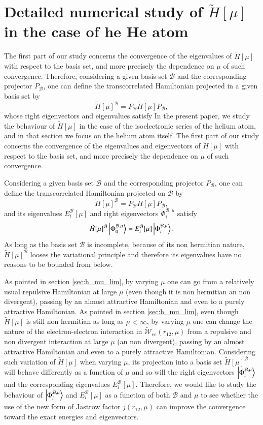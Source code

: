 \documentclass[aip,jcp,reprint,noshowkeys,superscriptaddress]{revtex4-1}
\newcommand{\phimub}[0]{\Phi^{\mathcal{B},\mu}_0}
\newcommand{\phiimub}[0]{\Phi^{\mathcal{B},\mu}_i}
\newcommand{\basis}[0]{\mathcal{B}}
\begin{document}
\section{Detailed numerical study of $\tilde{H}[\mu]$ in the case of he He atom}
The first part of our study concerns the convergence of the eigenvalues of $\tilde{H}[\mu]$ with respect to the basis set, and more precisely the dependence on $\mu$ of such convergence. 
Therefore, considering a given basis set $\basis$ and the corresponding projector $P_\basis$, one can define the transcorrelated Hamiltonian projected in a given basis set by
\begin{equation}
 \tilde{H}[\mu]^{\basis} = P_\basis \tilde{H}[\mu] P_\basis,
\end{equation}
whose right eigenvectors and eigenvalues satisfy 
In the present paper, we study the behaviour of $\tilde{H}[\mu]$ in the case of the isoelectronic series of the helium atom, and in that section we focus on the helium atom itself. 
The first part of our study concerns the convergence of the eigenvalues and eigenvectors of $\tilde{H}[\mu]$ with respect to the basis set, and more precisely the dependence on $\mu$ of such convergence. 

Considering a given basis set $\basis$ and the corresponding projector $P_\basis$, one can define the transcorrelated Hamiltonian projected on $\basis$ by
\begin{equation}
 \tilde{H}[\mu]^{\basis} = P_\basis \tilde{H}[\mu] P_\basis,
\end{equation}
and its eigenvalues $E_i^{\basis}[\mu]$ and right eigenvectors $\phiimub$ satisfy 
\begin{equation}
 \tilde{H}[\mu]^{\basis} \ket{\phimub} = E_i^{\basis}[\mu] \ket{\phiimub}. 
\end{equation}
As long as the basis set $\basis$ is incomplete, because of its non hermitian nature, $\tilde{H}[\mu]^{\basis}$ looses the variational principle and therefore its eigenvalues have no reasons to be bounded from below.  

As pointed in section \ref{sec:h_mu_lim}, by varying $\mu$ one can go from a relatively usual repulsive Hamiltonian at large $\mu$ (even though it is non hermitian an non divergent), passing by an almost attractive Hamiltonian and even to a purely attractive Hamiltonian. 
As pointed in section \ref{sec:h_mu_lim}, even though $\tilde{H}[\mu]$ is still non hermitian as long as $\mu < \infty$, by varying $\mu$ one can change the nature of the electron-electron interaction in $\tilde{\mathcal{W}}_{ee}(r_{12},\mu)$ from a repulsive and non divergent interaction at large $\mu$ (an non divergent), passing by an almost attractive Hamiltonian and even to a purely attractive Hamiltonian. 
Considering such variation of $\tilde{H}[\mu]$ when varying $\mu$,  
its projection into a basis set $\tilde{H}[\mu]^{\basis}$ will behave differently as a function of $\mu$ 
and so will the right eigenvectors $\ket{\phiimub}$ and the corresponding eigenvalues $E_i^{\basis}[\mu]$. 
Therefore, we would like to study the behaviour of $\ket{\phiimub}$ and $E_i^{\basis}[\mu]$ as a function of both $\basis$ and $\mu$ to see whether the use of the new form of Jastrow factor $j(r_{12},\mu)$ can improve the convergence toward the exact energies  and eigenvectors. 
\end{document}
